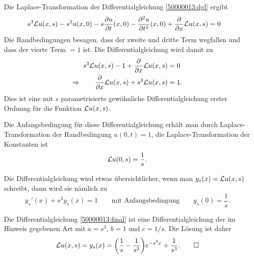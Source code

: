 \begin{loesung}
\begin{teilaufgaben}
\item
Die Laplace-Transformation der Differentialgleichung \eqref{50000013:dgl}
ergibt
\begin{align*}
s^3 {\cal L}u(x,s)
-s^2 u(x,0)
-s\frac{\partial u}{\partial t}(x,0)
-\frac{\partial^2 u}{\partial t^2}(x,0)
+
\frac{\partial}{\partial x}{\cal L}u(x,s)
&=
0
\end{align*}
Die Randbedingungen besagen, dass der zweite und dritte Term wegfallen
und dass der vierte Term $=1$ ist.
Die Differentialgleichung wird damit zu
\begin{align*}
s^3 {\cal L}u(x,s)
-1
+
\frac{\partial}{\partial x}{\cal L}u(x,s)
&=
0
\\
\Rightarrow\qquad
\frac{\partial}{\partial x}{\cal L}u(x,s)
+
s^3 {\cal L}u(x,s)
&=
1.
\end{align*}
Dies ist eine mit $s$ parametrisierte gewöhnliche Differentialgleichung
erster Ordnung für die Funktion ${\cal L}u(x,s)$.

Die Anfangsbedingung für diese Differentialgleichung erhält man durch
Laplace-Transformation der Randbedingung $u(0,t)=1$, die Laplace-Transformation
der Konstanten ist
\[
{\cal L}u(0,s) = \frac1s.
\]

Die Differentialgleichung wird etwas übersichtlicher, wenn man
$y_s(x) = {\cal L}u(x,s)$ schreibt, dann wird sie nämlich zu
\begin{equation}
y_s'(x) + s^3 y_s(x)=1
\qquad\text{mit Anfangsbedingung}\qquad
y_s(0)=\frac1s.
\label{50000013:final}
\end{equation}

\item
Die Differentialgleichung \eqref{50000013:final} ist eine Differentialgleichung
der im Hinweis gegebenen Art mit $a=s^3$, $b=1$ und $c=1/s$.
Die Lösung ist daher
\[
{\cal L}u(x,s)
=
y_s(x)
=
\biggl(\frac1s-\frac1{s^3}\biggr)e^{-s^3x} + \frac{1}{s^3}.
\qedhere
\]
\end{teilaufgaben}
\end{loesung}


